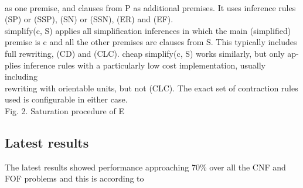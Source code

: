 \\as one premise, and clauses from P as additional premises. It uses inference rules
\\(SP) or (SSP), (SN) or (SSN), (ER) and (EF).
\\simplify(c, S) applies all simplification inferences in which the main (simplified)
\\premise is c and all the other premises are clauses from S. This typically includes
\\full rewriting, (CD) and (CLC). cheap simplify(c, S) works similarly, but only ap-
\\plies inference rules with a particularly low cost implementation, usually including
\\rewriting with orientable units, but not (CLC). The exact set of contraction rules
\\used is configurable in either case.
\\Fig. 2. Saturation procedure of E

  
\subsection{Latest results}
The latest results showed performance approaching 70\% over all the CNF and FOF problems and this is according to \cite{E13} 